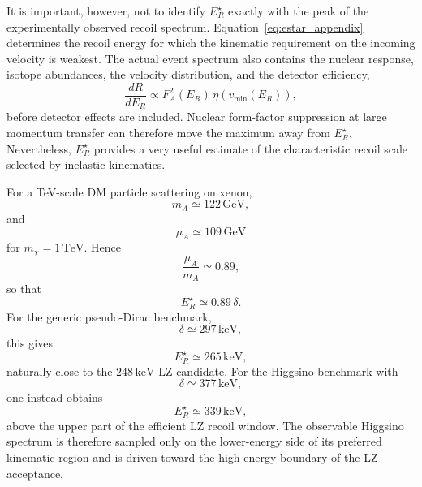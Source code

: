 \documentclass[aps,prd,reprint,superscriptaddress,nofootinbib,longbibliography,floatfix]{revtex4-2}
\newcommand{\GeV}{\mathrm{GeV}}
\newcommand{\TeV}{\mathrm{TeV}}
\newcommand{\keV}{\mathrm{keV}}
\begin{document}
It is important, however, not to identify $E_R^\star$ exactly with the peak of the experimentally observed recoil spectrum. Equation~\eqref{eq:estar_appendix} determines the recoil energy for which the kinematic requirement on the incoming velocity is weakest. The actual event spectrum also contains the nuclear response, isotope abundances, the velocity distribution, and the detector efficiency,
\begin{equation}
\frac{dR}{dE_R}
\propto
F_A^2(E_R)\,
\eta\left(v_{\min}(E_R)\right),
\end{equation}
before detector effects are included. Nuclear form-factor suppression at large momentum transfer can therefore move the maximum away from $E_R^\star$. Nevertheless, $E_R^\star$ provides a very useful estimate of the characteristic recoil scale selected by inelastic kinematics.

For a TeV-scale DM particle scattering on xenon,
\begin{equation}
m_A\simeq122\,\GeV,
\end{equation}
and
\begin{equation}
\mu_A\simeq109\,\GeV
\end{equation}
for $m_\chi=1\,\TeV$. Hence
\begin{equation}
\frac{\mu_A}{m_A}\simeq0.89,
\end{equation}
so that
\begin{equation}
E_R^\star\simeq0.89\,\delta.
\end{equation}
For the generic pseudo-Dirac benchmark,
\begin{equation}
\delta\simeq297\,\keV,
\end{equation}
this gives
\begin{equation}
E_R^\star\simeq265\,\keV,
\end{equation}
naturally close to the $248\,\keV$ LZ candidate. For the Higgsino benchmark with
\begin{equation}
\delta\simeq377\,\keV,
\end{equation}
one instead obtains
\begin{equation}
E_R^\star\simeq339\,\keV,
\end{equation}
above the upper part of the efficient LZ recoil window. The observable Higgsino spectrum is therefore sampled only on the lower-energy side of its preferred kinematic region and is driven toward the high-energy boundary of the LZ acceptance.
\end{document}
